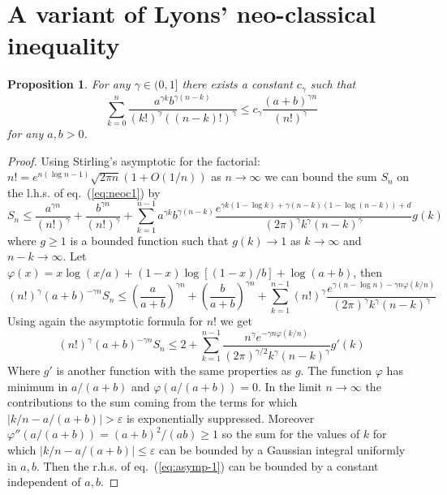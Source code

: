 \documentclass[a4paper,11pt,reqno]{article}
\newcommand{\1}{{\bf 1}}
\newcommand{\eps}{\varepsilon}
\newtheorem{proposition}[theorem]{Proposition}
\begin{document}
\section{A variant of Lyons' neo-classical inequality}
\label{app:neoc}
\begin{proposition}
For any $\gamma \in (0,1]$ there exists a constant $c_\gamma$ such that
\begin{equation}
  \label{eq:neoc1}
\sum_{k=0}^n \frac{a^{\gamma k} b^{\gamma (n-k)}}{(k!)^\gamma ((n-k)!)^\gamma} \le c_\gamma \frac{(a+b)^{\gamma n}}{(n!)^\gamma}  
\end{equation}
for any $a,b > 0$.
\end{proposition}
\begin{proof}
Using Stirling's asymptotic for the factorial:
$
n! = e^{n(\log n -1)}\sqrt{2 \pi n} (1+O(1/n))
$  as $n \to \infty$ we can bound the sum $S_n$ on the l.h.s. of eq.~(\ref{eq:neoc1}) by
\begin{equation*}
S_n \le \frac{a^{\gamma n}}{(n!)^\gamma} + \frac{b^{\gamma n }}{(n!)^\gamma} +  \sum_{k=1}^{n-1} a^{\gamma k} b^{\gamma (n-k)} \frac{e^{\gamma k(1-\log k) + \gamma (n-k)(1-\log (n-k)) +d}}{(2\pi)^{\gamma} k^{\gamma} (n-k)^{\gamma}} g(k) 
\end{equation*}
where $g \ge 1$ is a bounded function such that $g(k) \to 1$ as $k \to \infty$ and $n-k \to \infty$.
Let $\varphi(x) = x \log(x/a) + (1-x) \log[(1-x)/b] + \log(a+b)$, then
$$
(n!)^\gamma (a+b)^{-\gamma n}  S_n \le \left(\frac{a}{a+b}\right)^{\gamma n} + \left(\frac{b}{a+b}\right)^{\gamma n } +  \sum_{k=1}^{n-1} (n!)^{\gamma} \frac{e^{\gamma (n - \log n) -\gamma n \varphi(k/n)}}
{(2\pi)^{\gamma} k^{\gamma} (n-k)^{\gamma}} 
$$
Using again the asymptotic formula for $n!$ we get
\begin{equation}
  \label{eq:asymp-1}
(n!)^\gamma (a+b)^{-\gamma n} S_n \le 2 +  \sum_{k=1}^{n-1} \frac{n^{\gamma} e^{-\gamma n \varphi(k/n)}}
{(2\pi)^{\gamma/2} k^{\gamma} (n-k)^{\gamma}} g'(k)   
\end{equation}
Where $g'$ is another function with the same properties as $g$. The function $\varphi$ has minimum in $a/(a+b)$ and $\varphi(a/(a+b)) = 0$. In the limit $n \to \infty$ the contributions to the sum coming from the terms for which $|k/n - a/(a+b)| > \eps$ is exponentially suppressed. Moreover $\varphi''(a/(a+b)) = (a+b)^2/(ab) \ge 1$ so the sum for the values of $k$ for which $|k/n - a/(a+b)| \le \eps$ can be bounded by a Gaussian integral uniformly in $a,b$. Then the r.h.s. of eq.~(\ref{eq:asymp-1}) can be bounded by a constant independent of $a,b$.
\end{proof}
\end{document}
